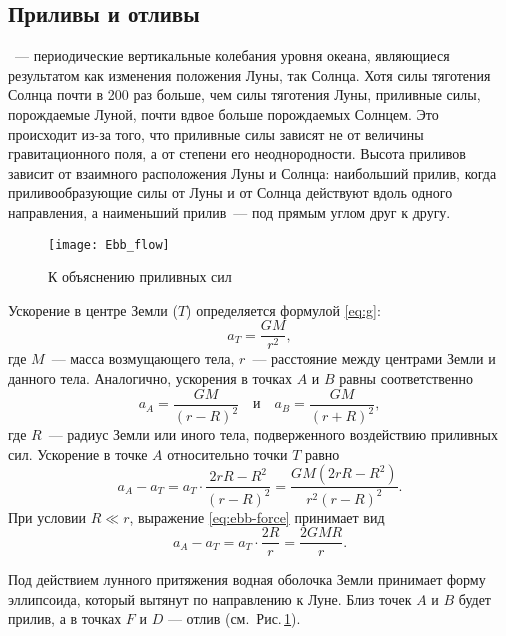 \subsection{Приливы и отливы}

~--- периодические вертикальные колебания уровня океана, являющиеся результатом как изменения положения Луны, так Солнца. Хотя силы тяготения Солнца почти в 200 раз больше, чем силы тяготения Луны, приливные силы, порождаемые Луной, почти вдвое больше порождаемых Солнцем. Это происходит из-за того, что приливные силы зависят не от величины гравитационного поля, а от степени его неоднородности. Высота приливов зависит от взаимного расположения Луны и Солнца: наибольший прилив, когда приливообразующие силы от Луны и от Солнца действуют вдоль одного направления, а наименьший прилив~--- под прямым углом друг к другу.

\begin{figure}[h!]
	\centering
	\texttt{[image: Ebb\_flow]}
	\caption{К объяснению приливных сил}\label{Ebb_flow}
\end{figure}
Ускорение в центре Земли ($T$) определяется формулой \eqref{eq:g}:
\begin{equation}
	a_T=\frac{G M}{r^2},
\end{equation}
где $M$~--- масса возмущающего тела, $r$~--- расстояние между центрами Земли и данного тела. Аналогично, ускорения в точках $A$ и $B$ равны соответственно
\begin{equation}
	a_A = \frac{G M}{(r - R)^2} \quad \text{и} \quad a_B = \frac{GM}{(r + R)^2},
\end{equation}
где $R$~--- радиус Земли или иного тела, подверженного воздействию приливных сил. Ускорение в точке $A$ относительно точки $T$ равно
\begin{equation}
	a_A - a_T = a_T \cdot \frac{2 r R - R^2}{(r - R)^2} = \frac{GM \left(2 r R - R^2 \right)}{r^2 (r - R)^2}.
	\label{eq:ebb-force}
\end{equation}
При условии $R\ll r$, выражение \eqref{eq:ebb-force} принимает вид \begin{equation}
a_A - a_T = a_T \cdot \frac{2 R}{r} = \frac{2 G M R}{r}.
\end{equation}

Под действием лунного притяжения водная оболочка Земли принимает форму 
эллипсоида, который вытянут по направлению к Луне. Близ точек $A$ и $B$ будет 
прилив, а в точках $F$ и $D$ --- отлив (см.~Рис.\,\ref{Ebb_flow}).